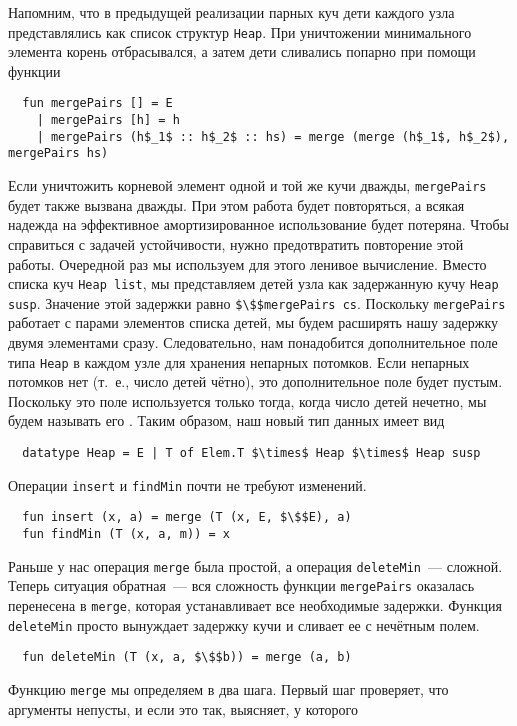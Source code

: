 Напомним, что в предыдущей реализации парных куч дети каждого узла
представлялись как список структур \lstinline!Heap!. При уничтожении
минимального элемента корень отбрасывался, а затем дети сливались
попарно при помощи функции
\begin{lstlisting}
  fun mergePairs [] = E
    | mergePairs [h] = h
    | mergePairs (h$_1$ :: h$_2$ :: hs) = merge (merge (h$_1$, h$_2$), mergePairs hs)
\end{lstlisting}
Если уничтожить корневой элемент одной и той же кучи дважды,
\lstinline!mergePairs!  будет также вызвана дважды. При этом работа
будет повторяться, а всякая надежда на эффективное амортизированное
использование будет потеряна. Чтобы справиться с задачей устойчивости,
нужно предотвратить повторение этой работы.  Очередной раз мы
используем для этого ленивое вычисление. Вместо списка куч
\lstinline!Heap list!, мы представляем детей узла как задержанную кучу
\lstinline!Heap susp!. Значение этой задержки равно
\lstinline!$\$$mergePairs cs!. Поскольку \lstinline!mergePairs!
работает с парами элементов списка детей, мы будем расширять нашу
задержку двумя элементами сразу. Следовательно, нам понадобится
дополнительное поле типа \lstinline!Heap! в каждом узле для хранения
непарных потомков. Если непарных потомков нет (т.~е., число детей
чётно), это дополнительное поле будет пустым. Поскольку это поле
используется только тогда, когда число детей нечетно, мы будем
называть его . Таким образом, наш
новый тип данных имеет вид
\begin{lstlisting}
  datatype Heap = E | T of Elem.T $\times$ Heap $\times$ Heap susp
\end{lstlisting}
Операции \lstinline!insert! и \lstinline!findMin! почти не требуют
изменений.
\begin{lstlisting}
  fun insert (x, a) = merge (T (x, E, $\$$E), a)
  fun findMin (T (x, a, m)) = x
\end{lstlisting}
Раньше у нас операция \lstinline!merge! была простой, а операция
\lstinline!deleteMin!~--- сложной. Теперь ситуация обратная~--- вся
сложность функции \lstinline!mergePairs! оказалась перенесена в
\lstinline!merge!, которая устанавливает все необходимые
задержки. Функция \lstinline!deleteMin! просто вынуждает задержку кучи
и сливает ее с нечётным полем.
\begin{lstlisting}
  fun deleteMin (T (x, a, $\$$b)) = merge (a, b)
\end{lstlisting}
Функцию \lstinline!merge! мы определяем в два шага. Первый шаг
проверяет, что аргументы непусты, и если это так, выясняет, у которого
